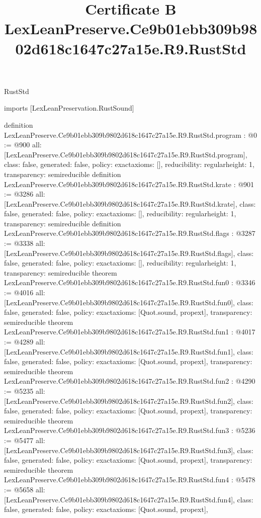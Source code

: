 \begin{lexlean}{RustStd}
\title{Certificate B LexLeanPreserve.Ce9b01ebb309b9802d618c1647c27a15e.R9.RustStd}
\begin{coremodule}
imports [LexLeanPreservation.RustSound]

definition LexLeanPreserve.Ce9b01ebb309b9802d618c1647c27a15e.R9.RustStd.program : @0 := @900 {
  all: [LexLeanPreserve.Ce9b01ebb309b9802d618c1647c27a15e.R9.RustStd.program],
  class: false,
  generated: false,
  policy: exact{axioms: []},
  reducibility: regular{height: 1},
  transparency: semireducible
}
definition LexLeanPreserve.Ce9b01ebb309b9802d618c1647c27a15e.R9.RustStd.krate : @901 := @3286 {
  all: [LexLeanPreserve.Ce9b01ebb309b9802d618c1647c27a15e.R9.RustStd.krate],
  class: false,
  generated: false,
  policy: exact{axioms: []},
  reducibility: regular{height: 1},
  transparency: semireducible
}
definition LexLeanPreserve.Ce9b01ebb309b9802d618c1647c27a15e.R9.RustStd.flags : @3287 := @3338 {
  all: [LexLeanPreserve.Ce9b01ebb309b9802d618c1647c27a15e.R9.RustStd.flags],
  class: false,
  generated: false,
  policy: exact{axioms: []},
  reducibility: regular{height: 1},
  transparency: semireducible
}
theorem LexLeanPreserve.Ce9b01ebb309b9802d618c1647c27a15e.R9.RustStd.fun0 : @3346 := @4016 {
  all: [LexLeanPreserve.Ce9b01ebb309b9802d618c1647c27a15e.R9.RustStd.fun0],
  class: false,
  generated: false,
  policy: exact{axioms: [Quot.sound, propext]},
  transparency: semireducible
}
theorem LexLeanPreserve.Ce9b01ebb309b9802d618c1647c27a15e.R9.RustStd.fun1 : @4017 := @4289 {
  all: [LexLeanPreserve.Ce9b01ebb309b9802d618c1647c27a15e.R9.RustStd.fun1],
  class: false,
  generated: false,
  policy: exact{axioms: [Quot.sound, propext]},
  transparency: semireducible
}
theorem LexLeanPreserve.Ce9b01ebb309b9802d618c1647c27a15e.R9.RustStd.fun2 : @4290 := @5235 {
  all: [LexLeanPreserve.Ce9b01ebb309b9802d618c1647c27a15e.R9.RustStd.fun2],
  class: false,
  generated: false,
  policy: exact{axioms: [Quot.sound, propext]},
  transparency: semireducible
}
theorem LexLeanPreserve.Ce9b01ebb309b9802d618c1647c27a15e.R9.RustStd.fun3 : @5236 := @5477 {
  all: [LexLeanPreserve.Ce9b01ebb309b9802d618c1647c27a15e.R9.RustStd.fun3],
  class: false,
  generated: false,
  policy: exact{axioms: [Quot.sound, propext]},
  transparency: semireducible
}
theorem LexLeanPreserve.Ce9b01ebb309b9802d618c1647c27a15e.R9.RustStd.fun4 : @5478 := @5658 {
  all: [LexLeanPreserve.Ce9b01ebb309b9802d618c1647c27a15e.R9.RustStd.fun4],
  class: false,
  generated: false,
  policy: exact{axioms: [Quot.sound, propext]},
}
\end{coremodule}
\end{lexlean}
